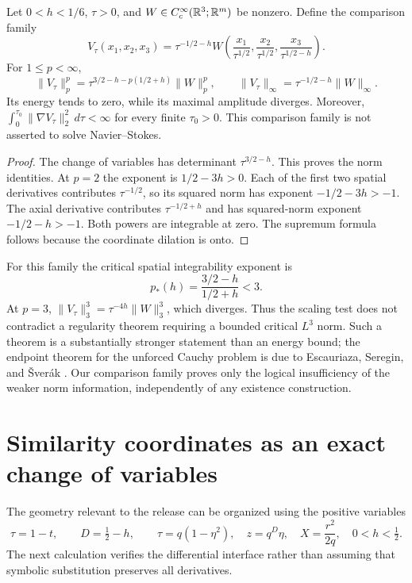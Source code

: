 \begin{proposition}
\label{prop:ns-anisotropic-scaling}
Let $0<h<1/6$, $\tau>0$, and $W\in C_c^\infty(\mathbb{R}^3;\mathbb{R}^m)$ be nonzero.
Define the comparison family
\[
 V_\tau(x_1,x_2,x_3)=\tau^{-1/2-h}
 W\left(\frac{x_1}{\tau^{1/2}},
        \frac{x_2}{\tau^{1/2}},
        \frac{x_3}{\tau^{1/2-h}}\right).
\]
For $1\leq p<\infty$,
\[
 \|V_\tau\|_p^p
  =\tau^{3/2-h-p(1/2+h)}\|W\|_p^p,
 \qquad
 \|V_\tau\|_\infty=\tau^{-1/2-h}\|W\|_\infty.
\]
Its energy tends to zero, while its maximal amplitude diverges. Moreover,
$\int_0^{\tau_0}\|\nabla V_\tau\|_2^2\,d\tau<\infty$ for every finite
$\tau_0>0$. This comparison family is not asserted to solve Navier--Stokes.
\end{proposition}
\begin{proof}
The change of variables has determinant $\tau^{3/2-h}$. This proves the
norm identities. At $p=2$ the exponent is $1/2-3h>0$. Each of the first
two spatial derivatives contributes $\tau^{-1/2}$, so its squared norm has
exponent $-1/2-3h>-1$. The axial derivative contributes
$\tau^{-1/2+h}$ and has squared-norm exponent $-1/2-h>-1$.
Both powers are integrable at zero. The supremum formula follows because
the coordinate dilation is onto.
\end{proof}

For this family the critical spatial integrability exponent is
\[
 p_*(h)=\frac{3/2-h}{1/2+h}<3.
\]
At $p=3$, $\|V_\tau\|_3^3=\tau^{-4h}\|W\|_3^3$, which diverges.
Thus the scaling test does not contradict a regularity theorem requiring
a bounded critical $L^3$ norm. Such a theorem is a substantially stronger
statement than an energy bound; the endpoint theorem for the unforced
Cauchy problem is due to Escauriaza, Seregin, and \v Sver\'ak
\citep{NSEscauriazaSereginSverak2003}. Our comparison family proves only
the logical insufficiency of the weaker norm information, independently
of any existence construction.

\section{Similarity coordinates as an exact change of variables}

The geometry relevant to the release can be organized using the positive
variables
\[
 \tau=1-t,\qquad D=\tfrac12-h,\qquad
 \tau=q(1-\eta^2),\quad z=q^D\eta,\quad X=\frac{r^2}{2q},
 \quad 0<h<\tfrac12.
\]
The next calculation verifies the differential interface rather than
assuming that symbolic substitution preserves all derivatives.

